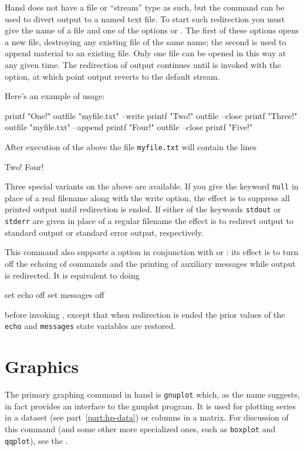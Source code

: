 Hansl does not have a file or ``stream'' type as such, but the
 command can be used to divert output to a named text
file. To start such redirection you must give the name of a file and
one of the options  or .  The first of
these options opens a new file, destroying any existing file of the
same name; the second is used to append material to an existing file.
Only one file can be opened in this way at any given time. The
redirection of output continues until  is invoked with
the  option, at which point output reverts to the
default stream.

Here's an example of usage:
\begin{code}
  printf "One!\n"
  outfile "myfile.txt" --write
  printf "Two!\n"
  outfile --close
  printf "Three!\n"
  outfile "myfile.txt" --append
  printf "Four!\n"
  outfile --close
  printf "Five!\n"
\end{code}
After execution of the above the file \texttt{myfile.txt} will contain
the lines
\begin{code}
Two!
Four!  
\end{code}

Three special variants on the above are available. If you give the
keyword \texttt{null} in place of a real filename along with the write
option, the effect is to suppress all printed output until redirection
is ended. If either of the keywords \texttt{stdout} or \texttt{stderr}
are given in place of a regular filename the effect is to redirect
output to standard output or standard error output, respectively.

This command also supports a  option in conjunction with
 or : its effect is to turn off the
echoing of commands and the printing of auxiliary messages while
output is redirected. It is equivalent to doing
\begin{code}
  set echo off 
  set messages off
\end{code}
before invoking , except that when redirection is ended
the prior values of the \texttt{echo} and \texttt{messages} state
variables are restored.

\section{Graphics}

The primary graphing command in hansl is \texttt{gnuplot} which, as
the name suggests, in fact provides an interface to the
\textsf{gnuplot} program. It is used for plotting series in a dataset
(see part~\ref{part:hp-data}) or columns in a matrix. For discussion
of this command (and some other more specialized ones, such as
\texttt{boxplot} and \texttt{qqplot}), see the \GUG.


